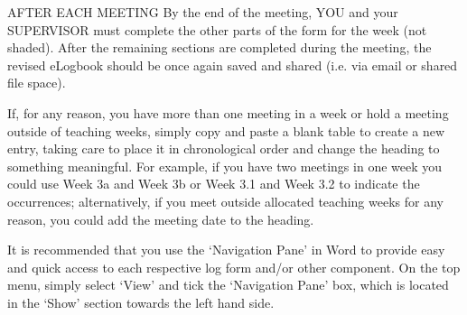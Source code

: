 \documentclass[../CHEFCookingHelperForEveryonesFridge.tex]{subfiles}
\begin{document}
AFTER EACH MEETING
By the end of the meeting, YOU and your SUPERVISOR must complete the other parts of the form for the week (not shaded). After the remaining sections are completed during the meeting, the revised eLogbook should be once again saved and shared (i.e. via email or shared file space).

If, for any reason, you have more than one meeting in a week or hold a meeting outside of teaching weeks, simply copy and paste a blank table to create a new entry, taking care to place it in chronological order and change the heading to something meaningful. For example, if you have two meetings in one week you could use Week 3a and Week 3b or Week 3.1 and Week 3.2 to indicate the occurrences; alternatively, if you meet outside allocated teaching weeks for any reason, you could add the meeting date to the heading.

It is recommended that you use the ‘Navigation Pane’ in Word to provide easy and quick access to each respective log form and/or other component.  On the top menu, simply select ‘View’ and tick the ‘Navigation Pane’ box, which is located in the ‘Show’ section towards the left hand side. 




\end{document}
